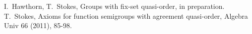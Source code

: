 \documentclass[landscape,a1paper,fontscale=0.48,final]{baposter}
\begin{document}
\begin{poster}
{\begin{thebibliography}{1}
       \bibitem{} I.~Hawthorn, T.~Stokes, Groups with fix-set quasi-order, in preparation.
       \bibitem{} T.~Stokes, Axioms for function semigroups with agreement quasi-order, Algebra Univ 66 (2011), 85-98.
       \end{thebibliography}
   }


\end{poster}%
%
\end{document}
